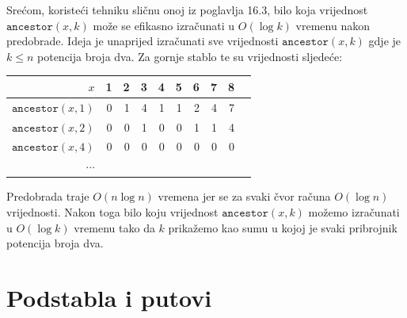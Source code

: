 Srećom, koristeći tehniku sličnu onoj
iz poglavlja 16.3, bilo koja vrijednost $\texttt{ancestor}(x,k)$
može se efikasno izračunati u $O(\log k)$ vremenu
nakon predobrade.
Ideja je unaprijed izračunati sve vrijednosti $\texttt{ancestor}(x,k)$
gdje je $k \le n$ potencija broja dva.
Za gornje stablo te su vrijednosti
sljedeće:

\begin{center}
\begin{tabular}{r|rrrrrrrrr}
$x$ & 1 & 2 & 3 & 4 & 5 & 6 & 7 & 8 \\
\hline
$\texttt{ancestor}(x,1)$ & 0 & 1 & 4 & 1 & 1 & 2 & 4 & 7 \\
$\texttt{ancestor}(x,2)$ & 0 & 0 & 1 & 0 & 0 & 1 & 1 & 4 \\
$\texttt{ancestor}(x,4)$ & 0 & 0 & 0 & 0 & 0 & 0 & 0 & 0 \\
$\cdots$ \\
\end{tabular}
\end{center}

Predobrada traje $O(n \log n)$ vremena
jer se za svaki čvor računa $O(\log n)$ vrijednosti.
Nakon toga bilo koju vrijednost $\texttt{ancestor}(x,k)$ možemo izračunati
u $O(\log k)$ vremenu tako da $k$ prikažemo
kao sumu u kojoj je svaki pribrojnik potencija broja dva.

\section{Podstabla i putovi}


